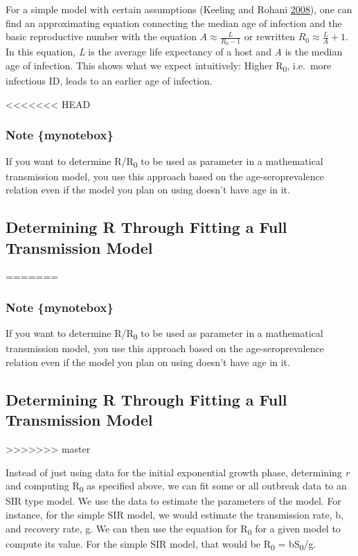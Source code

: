 \documentclass[]{book}
\theoremstyle{definition}
\theoremstyle{definition}
\theoremstyle{definition}
\theoremstyle{remark}
\begin{document}
For a simple model with certain assumptions (Keeling and Rohani
\protect\hyperlink{ref-keeling08}{2008}), one can find an approximating
equation connecting the median age of infection and the basic
reproductive number with the equation \(A \approx \frac {L}{R_0 - 1}\)
or rewritten \(R_0 \approx \frac{L}{A} + 1\). In this equation, \emph{L}
is the average life expectancy of a host and \emph{A} is the median age
of infection. This shows what we expect intuitively: Higher
R\textsubscript{0}, i.e.~more infectious ID, leads to an earlier age of
infection.

<<<<<<< HEAD
\hypertarget{note-mynotebox}{%
\subsubsection{Note \{mynotebox\}}\label{note-mynotebox}}

If you want to determine R/R\textsubscript{0} to be used as parameter in
a mathematical transmission model, you use this approach based on the
age-seroprevalence relation even if the model you plan on using doesn't
have age in it.

\hypertarget{determining-r-through-fitting-a-full-transmission-model}{%
\subsection{Determining R Through Fitting a Full Transmission
Model}\label{determining-r-through-fitting-a-full-transmission-model}}
=======
\subsubsection{Note \{mynotebox\}}\label{note-mynotebox}

If you want to determine R/R\textsubscript{0} to be used as parameter in
a mathematical transmission model, you use this approach based on the
age-seroprevalence relation even if the model you plan on using doesn't
have age in it.

\subsection{Determining R Through Fitting a Full Transmission
Model}\label{determining-r-through-fitting-a-full-transmission-model}
>>>>>>> master

Instead of just using data for the initial exponential growth phase,
determining \emph{r} and computing R\textsubscript{0} as specified
above, we can fit some or all outbreak data to an SIR type model. We use
the data to estimate the parameters of the model. For instance, for the
simple SIR model, we would estimate the transmission rate, b, and
recovery rate, g. We can then use the equation for R\textsubscript{0}
for a given model to compute its value. For the simple SIR model, that
would be R\textsubscript{0} = bS\textsubscript{0}/g.
\end{document}
